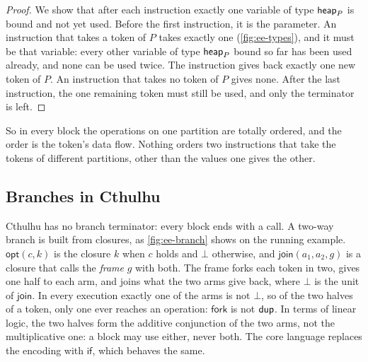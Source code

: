 \begin{proof}
We show that after each instruction exactly one variable of type $\mathsf{heap}_{P}$ is
bound and not yet used. Before the first instruction, it is the parameter.
An instruction that takes a token of $P$ takes exactly one
(\cref{fig:ee-types}), and it must be that variable: every other variable of
type $\mathsf{heap}_{P}$ bound so far has been used already, and none can be used twice.
The instruction gives back exactly one new token of $P$. An instruction that
takes no token of $P$ gives none. After the last instruction, the one
remaining token must still be used, and only the terminator is left.
\end{proof}

So in every block the operations on one partition are totally ordered, and the
order is the token's data flow. Nothing orders two instructions that take the
tokens of different partitions, other than the values one gives the other.

\subsection{Branches in Cthulhu}\label{sec:ee-branches}

Cthulhu has no branch terminator: every block ends with a call. A two-way
branch is built from closures, as \cref{fig:ee-branch} shows on the running
example. $\mathsf{opt}(c, k)$ is the closure $k$ when $c$ holds and $\bot$
otherwise, and $\mathsf{join}(a_1, a_2, g)$ is a closure that calls the
\emph{frame} $g$ with both. The frame forks each token in two, gives one half to
each arm, and joins what the two arms give back, where $\bot$ is the unit of
$\mathsf{join}$. In every execution exactly one of the arms is not $\bot$, so of
the two halves of a token, only one ever reaches an operation: $\mathsf{fork}$
is not $\mathsf{dup}$. In terms of linear logic, the two halves form the additive
conjunction of the two arms, not the multiplicative one: a block may use either,
never both. The core language replaces the encoding with $\mathsf{if}$, which
behaves the same.


